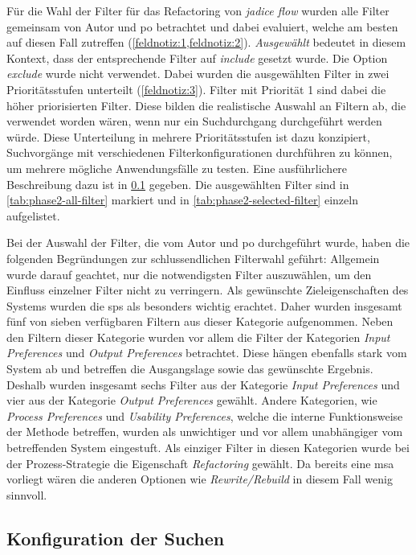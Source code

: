 Für die Wahl der Filter für das Refactoring von \emph{jadice flow} wurden alle Filter gemeinsam von Autor und \gls{po} betrachtet und dabei evaluiert, welche am besten auf diesen Fall zutreffen (\cref{feldnotiz:1,feldnotiz:2}).
\emph{Ausgewählt} bedeutet in diesem Kontext, dass der entsprechende Filter auf \emph{include} gesetzt wurde.
Die Option \emph{exclude} wurde nicht verwendet.
Dabei wurden die ausgewählten Filter in zwei Prioritätsstufen unterteilt (\cref{feldnotiz:3}).
Filter mit Priorität 1 sind dabei die höher priorisierten Filter.
Diese bilden die realistische Auswahl an Filtern ab, die verwendet worden wären, wenn nur ein Suchdurchgang durchgeführt werden würde.
Diese Unterteilung in mehrere Prioritätsstufen ist dazu konzipiert, Suchvorgänge mit verschiedenen Filterkonfigurationen durchführen zu können, um mehrere mögliche Anwendungsfälle zu testen.
Eine ausführlichere Beschreibung dazu ist in \cref{sec:phase2-suchconfig} gegeben.
Die ausgewählten Filter sind in \cref{tab:phase2-all-filter} markiert und in \cref{tab:phase2-selected-filter} einzeln aufgelistet.



Bei der Auswahl der Filter, die vom Autor und \gls{po} durchgeführt wurde, haben die folgenden Be\-gründungen zur schlussendlichen Filterwahl geführt:
Allgemein wurde darauf geachtet, nur die notwendigsten Filter auszuwählen, um den Einfluss einzelner Filter nicht zu verringern.
Als gewünschte Zieleigenschaften des Systems wurden die \glspl{sp} als besonders wichtig erachtet.
Daher wurden insgesamt fünf von sieben verfügbaren Filtern aus dieser Kategorie aufgenommen.
Neben den Filtern dieser Kategorie wurden vor allem die Filter der Kategorien \emph{Input Preferences} und \emph{Output Preferences} betrachtet.
Diese hängen ebenfalls stark vom System ab und betreffen die Ausgangslage sowie das gewünschte Ergebnis.
Deshalb wurden insgesamt sechs Filter aus der Kategorie \emph{Input Preferences} und vier aus der Kategorie \emph{Output Preferences} gewählt.
Andere Kategorien, wie \emph{Process Preferences} und \emph{Usability Preferences}, welche die interne Funktionsweise der Methode betreffen, wurden als unwichtiger und vor allem unabhängiger vom betreffenden System eingestuft.
Als einziger Filter in diesen Kategorien wurde bei der Prozess-Strategie die Eigenschaft \emph{Refactoring} gewählt.
Da bereits eine \gls{msa} vorliegt wären die anderen Optionen wie \emph{Rewrite/Rebuild} in diesem Fall wenig sinnvoll.

\subsection{Konfiguration der Suchen}
\label{sec:phase2-suchconfig}

